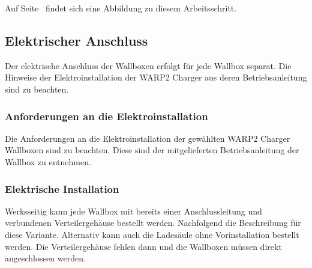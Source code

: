 \documentclass[a4paper,10pt]{article}
\begin{document}
\begin{multicols*}{2}
	Auf Seite~\pageref{appendix_erection} findet sich eine
	Abbildung zu diesem Arbeitsschritt.

	\subsection{Elektrischer Anschluss}
	Der elektrische Anschluss der Wallboxen erfolgt für jede Wallbox separat.
	Die Hinweise der Elektroinstallation der WARP2 Charger aus deren
	Betriebsanleitung sind zu beachten.

	\subsubsection{Anforderungen an die Elektroinstallation}
	Die Anforderungen an die Elektroinstallation der gewählten WARP2
	Charger Wallboxen sind zu beachten. Diese sind der mitgelieferten
	Betriebsanleitung der Wallbox zu entnehmen.

	\subsubsection{Elektrische Installation}
	Werksseitig kann jede Wallbox mit bereits einer Anschlussleitung
	und verbundenen Verteilergehäuse bestellt werden. Nachfolgend die
	Beschreibung für diese Variante. Alternativ kann auch die Ladesäule ohne
	Vorinstallation bestellt werden. Die Verteilergehäuse fehlen dann und die
	Wallboxen müssen direkt angeschlossen werden.


\end{multicols*}
\end{document}
